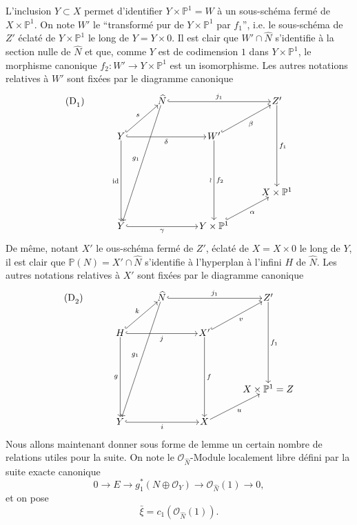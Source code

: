 L'inclusion $Y\subset X$ permet d'identifier $Y\times\mathbb{P}^1=W$ à un sous-schéma fermé de $X\times\mathbb{P}^1$. On note $W'$ le ``transformé pur de $Y\times\mathbb{P}^1$ par $f_1$'', i.e. le sous-schéma de $Z'$ éclaté de $Y\times\mathbb{P}^1$ le long de $Y=Y\times0$. Il est clair que $W'\cap\widehat N$ s'identifie à la section nulle de $\widehat N$ et que, comme $Y$ est de codimension $1$ dans $Y\times\mathbb{P}^1$, le morphisme canonique $f_2:W'\to Y\times\mathbb{P}^1$ est un isomorphisme. Les autres notations relatives à $W'$ sont fixées par le diagramme canonique
\[
\begin{tikzcd}[column sep=3.2em,row sep=2.4em,cells={nodes={inner sep=1pt}}]
\text{(D}_1\text{)}\arrow[from=1-3,to=5-2,"g_1"']
& & \widehat N \arrow[rr,hook,"j_1"] & & Z' \arrow[ddd,"f_1"] \\
& Y \arrow[ur,hook,"s"] \arrow[rr,hook,"\delta"'] \arrow[ddd,"\mathrm{id}"'] & &
W' \arrow[ur,hook,"\beta"'] \arrow[ddd,"\wr"',"f_2"] & \\
& & & & \\
& & & & X\times\mathbb{P}^1 \\
& Y \arrow[rr,hook,"\gamma"'] & & Y\times\mathbb{P}^1 \arrow[ur,hook,"\alpha"'] &
\end{tikzcd}
\]
De même, notant $X'$ le ous-schéma fermé de $Z'$, éclaté de $X=X\times0$ le long de $Y$, il est
clair que $\mathbb{P}(N)=X'\cap\widehat N$ s'identifie à l'hyperplan à l'infini $H$ de $\widehat N$. Les autres notations relatives à $X'$ sont fixées par le diagramme canonique
\[
\begin{tikzcd}[column sep=3.2em,row sep=2.4em,cells={nodes={inner sep=1pt}}]
\text{(D}_2\text{)}\arrow[from=1-3,to=5-2,"g_1"']
& & \widehat N \arrow[rr,hook,"j_1"] & & Z' \arrow[ddd,"f_1"] \\
& H \arrow[ur,hook,"k"] \arrow[rr,hook,"j"'] \arrow[ddd,"g"'] & &
X' \arrow[ur,hook,"v"'] \arrow[ddd,"f"] & \\
& & & & \\
& & & & X\times\mathbb{P}^1=Z \\
& Y \arrow[rr,hook,"i"'] & & X \arrow[ur,"u"'] &
\end{tikzcd}
\]
Nous allons maintenant donner sous forme de lemme un certain nombre de relations utiles pour la suite. On note le $\mathcal{O}_{\widehat N}$-Module localement libre défini par la suite exacte canonique
\[
0\to E\to g_1^*(N\oplus\mathcal{O}_Y)\to\mathcal{O}_{\widehat N}(1)\to0,
\tag{9.3.0}
\]
et on pose
\[
\bar\xi=c_1(\mathcal{O}_{\widehat N}(1)).
\tag{9.3.1}
\]

